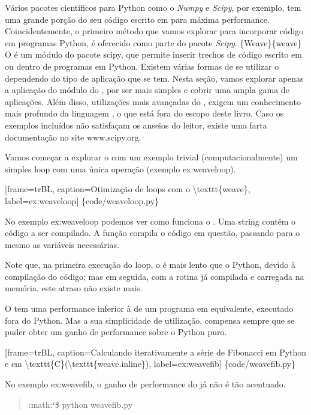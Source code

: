 \documentclass[a4paper,10pt,portuguese]{sphinxmanual}
\begin{document}
Vários pacotes científicos para Python como o \emph{Numpy} e \emph{Scipy},
por exemplo, tem uma grande porção do seu código escrito em 
para máxima performance. Coincidentemente, o primeiro método que
vamos explorar para incorporar código  em programas Python, é
oferecido como parte do pacote \emph{Scipy}. \{Weave\}\{weave\} O 
é um módulo do pacote scipy, que permite inserir trechos de código
escrito em  ou  dentro de programas em Python. Existem
várias formas de se utilizar o  dependendo do tipo de
aplicação que se tem. Nesta seção, vamos explorar apenas a
aplicação do módulo  do , por ser mais simples e
cobrir uma ampla gama de aplicações. Além disso, utilizações mais
avançadas do , exigem um conhecimento mais profundo da
linguagem , o que está fora do escopo deste livro. Caso os
exemplos incluídos não satisfaçam os anseios do leitor, existe uma
farta documentação no site www.scipy.org.

Vamos começar a explorar o  com um exemplo trivial
(computacionalmente) um simples loop com uma única operação
(exemplo ex:weaveloop).

{[}frame=trBL, caption=Otimização de loops com o \textbackslash{}texttt\{weave\}, label=ex:weaveloop{]} \{code/weaveloop.py\}

No exemplo ex:weaveloop podemos ver como funciona o . Uma
string contém o código  a ser compilado. A função 
compila o código em questão, passando para o mesmo as variáveis
necessárias.

Note que, na primeira execução do loop, o  é mais lento
que o Python, devido à compilação do código; mas em seguida, com a
rotina já compilada e carregada na memória, este atraso não existe
mais.

O  tem uma performance inferior à de um programa em
 equivalente, executado fora do Python. Mas a sua simplicidade
de utilização, compensa sempre que se puder obter um ganho de
performance sobre o Python puro.

{[}frame=trBL, caption=Calculando iterativamente a série de Fibonacci em Python e em \textbackslash{}texttt\{C\}(\textbackslash{}texttt\{weave.inline\}), label=ex:weavefib{]} \{code/weavefib.py\}

No exemplo ex:weavefib, o ganho de performance do 
já não é tão acentuado.
\begin{quote}

:math:{\color{red}\bfseries{}{}`}\$ python weavefib.py
\end{quote}
\end{document}

